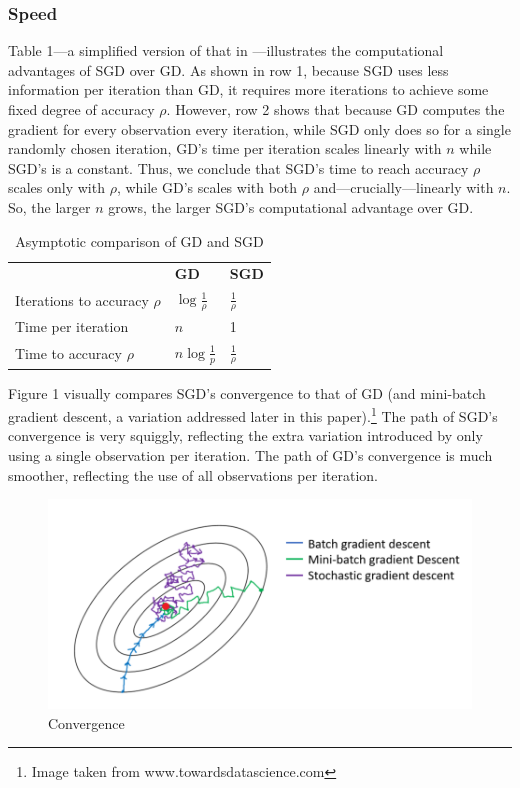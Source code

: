 \documentclass{article}
\begin{document}
\subsubsection{Speed}

Table 1---a simplified version of that in \cite{bottou2010large}---illustrates
the computational advantages of SGD over GD. As shown in row 1, because SGD uses
less information per iteration than GD, it requires more iterations to achieve
some fixed degree of accuracy $\rho$.
However, row 2 shows that because GD computes the gradient for every observation every iteration,
while SGD only does so for a single randomly chosen iteration, GD's time per
iteration scales linearly with $n$ while SGD's is a constant. Thus, we conclude
that SGD's time to
reach accuracy $\rho$ scales only with $\rho$, while GD's scales with both
$\rho$ and---crucially---linearly with $n$. So, the larger $n$ grows, the larger
SGD's computational advantage over GD.

\begin{table}[h!]
	\centering
	\caption{Asymptotic comparison of GD and SGD}
	\begin{tabular}{|l l l|}
		\hline
		& \textbf{GD} & \textbf{SGD} \\
		Iterations to accuracy $\rho$ & $\log \frac{1}{\rho}$ & $\frac{1}{\rho}$ \\
		Time per iteration & $n$ & 1 \\
		Time to accuracy $\rho$ & $n \log \frac{1}{p}$ & $\frac{1}{\rho}$ \\
		\hline
	\end{tabular}
\end{table}

Figure 1 visually compares SGD's convergence to that of GD (and
mini-batch gradient descent, a variation addressed later in this
paper).\footnote{Image taken from www.towardsdatascience.com} The
path of SGD's convergence is very squiggly, reflecting the extra variation
introduced by only using a single observation per iteration. The path of GD's
convergence is much smoother, reflecting the use of all observations per
iteration.

\begin{figure}[h!]
	\centering
	\caption{Convergence}
\includegraphics[scale=0.3]{img}
\end{figure}
\end{document}
